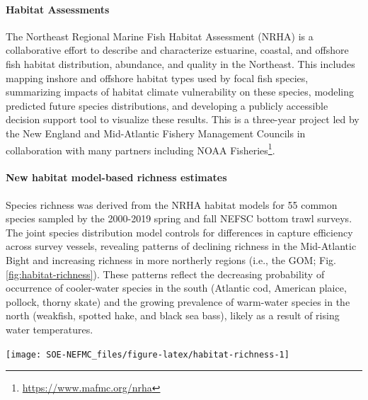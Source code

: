 \documentclass[
  10pt,
]{article}
\let\origfigure\figure
\let\endorigfigure\endfigure
\renewenvironment{figure}[1][2] {
    \expandafter\origfigure\expandafter[H]
} {
    \endorigfigure
}
\begin{document}
\hypertarget{habitat-assessments}{%
\paragraph{Habitat Assessments}\label{habitat-assessments}}

The Northeast Regional Marine Fish Habitat Assessment (NRHA) is a collaborative effort to describe and characterize estuarine, coastal, and offshore fish habitat distribution, abundance, and quality in the Northeast. This includes mapping inshore and offshore habitat types used by focal fish species, summarizing impacts of habitat climate vulnerability on these species, modeling predicted future species distributions, and developing a publicly accessible decision support tool to visualize these results. This is a three-year project led by the New England and Mid-Atlantic Fishery Management Councils in collaboration with many partners including NOAA Fisheries\footnote{\url{https://www.mafmc.org/nrha}}.

\hypertarget{new-habitat-model-based-richness-estimates}{%
\paragraph{New habitat model-based richness estimates}\label{new-habitat-model-based-richness-estimates}}

Species richness was derived from the NRHA habitat models for 55 common species sampled by the 2000-2019 spring and fall NEFSC bottom trawl surveys. The joint species distribution model controls for differences in capture efficiency across survey vessels, revealing patterns of declining richness in the Mid-Atlantic Bight and increasing richness in more northerly regions (i.e., the GOM; Fig. \ref{fig:habitat-richness}). These patterns reflect the decreasing probability of occurrence of cooler-water species in the south (Atlantic cod, American plaice, pollock, thorny skate) and the growing prevalence of warm-water species in the north (weakfish, spotted hake, and black sea bass), likely as a result of rising water temperatures.

\begin{figure}

{\centering \texttt{[image: SOE-NEFMC\_files/figure-latex/habitat-richness-1]} 

}

\caption{Habitat model-based species richness for 55 common species sampled by NEFSC bottom trawl surveys.}\label{fig:habitat-richness}
\end{figure}
\end{document}
